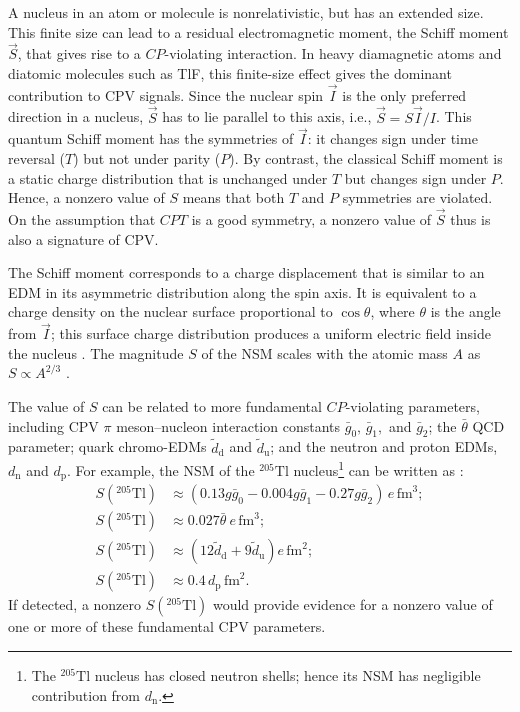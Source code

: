 A nucleus in an atom or molecule is nonrelativistic, but has an extended size. This finite size can lead to a residual electromagnetic moment, the Schiff moment $\vec S$, that gives rise to a $CP$-violating interaction. In heavy diamagnetic atoms and diatomic molecules such as TlF, this finite-size effect gives the dominant contribution to CPV signals. Since the nuclear spin $\vec{I}$ is the only preferred direction in a nucleus, $\vec S$ has to lie parallel to this axis, i.e., $\vec{S} = S\vec{I}/I$. This quantum Schiff moment has the symmetries of $\vec{I}$: it changes sign under time reversal ($T$) but not under parity ($P$). By contrast, the classical Schiff moment is a static charge distribution that is unchanged under $T$ but changes sign under $P$. Hence, a nonzero value of $S$ means that both $T$ and $P$ symmetries are violated.
On the assumption that $CPT$ is a good symmetry, a nonzero value of $\vec S$ thus is also a signature of CPV.

The Schiff moment corresponds to a charge displacement that is similar to an EDM in its asymmetric distribution along the spin axis. It is equivalent to a charge density on the nuclear surface proportional to $\cos{\theta}$, where $\theta$ is the angle from $\vec{I}$; this surface charge distribution produces a uniform electric field inside the nucleus \cite{GingesFlambaum2004}. The magnitude $S$ of the NSM scales with the atomic mass $A$ as $S\propto A^{2/3}$ \cite{khriplovich1997}.

The value of $S$ can be related to more fundamental $CP$-violating parameters, including CPV $\pi$ meson--nucleon interaction constants $\bar{g}_{0},\,\bar{g}_1,$ and $\bar{g}_2$; the $\bar{\theta}$ QCD parameter; quark chromo-EDMs $\widetilde{d}_\text{d}$ and $\widetilde{d}_\text{u}$; and the neutron and proton EDMs, $d_\text{n}$ and $d_\text{p}$.  For example, the NSM of the $^{205}\mathrm{Tl}$ nucleus\footnote{The $^{205}\mathrm{Tl}$ nucleus has closed neutron shells; hence its NSM has negligible contribution from $d_\text{n}$.}  can be written as \cite{PhysRevA.101.042504,PhysRevA.101.042501}:
\begin{equation} 
    \label{eq:schiff_contributions}
        \begin{split}
            S\left(^{205}\mathrm{Tl}\right) & \approx \left(0.13g\bar{g}_0 - 0.004g\bar{g}_1 - 0.27 g \bar{g}_2\right) \,e\,\mathrm{fm}^3; \\
            S\left(^{205}\mathrm{Tl}\right) & \approx 0.027 \bar{\theta}\ e\,\mathrm{fm}^3; \\
            S\left(^{205}\mathrm{Tl}\right) & \approx \left(12\widetilde{d}_\text{d}+9\widetilde{d}_\text{u}\right) e\,\mathrm{fm}^2; \\
            S\left(^{205}\mathrm{Tl}\right) & \approx 0.4\,d_\text{p} \,\mathrm{fm}^2.
    \end{split}
\end{equation}
If detected, a nonzero $S\left(^{205}\mathrm{Tl}\right)$ would provide evidence for a nonzero value of one or more of these fundamental CPV parameters.

